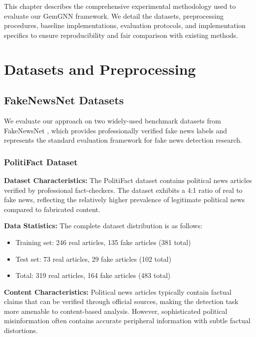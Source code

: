 
This chapter describes the comprehensive experimental methodology used to evaluate our GemGNN framework. We detail the datasets, preprocessing procedures, baseline implementations, evaluation protocols, and implementation specifics to ensure reproducibility and fair comparison with existing methods.

\section{Datasets and Preprocessing}

\subsection{FakeNewsNet Datasets}

We evaluate our approach on two widely-used benchmark datasets from FakeNewsNet \cite{shu2018fakenewsnet}, which provides professionally verified fake news labels and represents the standard evaluation framework for fake news detection research.

\subsubsection{PolitiFact Dataset}

\textbf{Dataset Characteristics:} The PolitiFact dataset contains political news articles verified by professional fact-checkers. The dataset exhibits a 4:1 ratio of real to fake news, reflecting the relatively higher prevalence of legitimate political news compared to fabricated content.

\textbf{Data Statistics:} The complete dataset distribution is as follows:
\begin{itemize}
\item Training set: 246 real articles, 135 fake articles (381 total)
\item Test set: 73 real articles, 29 fake articles (102 total)  
\item Total: 319 real articles, 164 fake articles (483 total)
\end{itemize}

\textbf{Content Characteristics:} Political news articles typically contain factual claims that can be verified through official sources, making the detection task more amenable to content-based analysis. However, sophisticated political misinformation often contains accurate peripheral information with subtle factual distortions.

